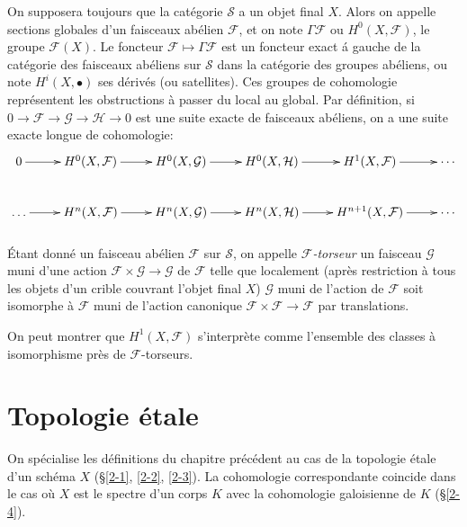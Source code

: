 \documentclass{article}
\newcommand{\cF}{\mathcal{F}}
\newcommand{\cG}{\mathcal{G}}
\newcommand{\cH}{\mathcal{H}}
\newcommand{\cS}{\mathcal{S}}
\begin{document}
On supposera toujours que la catégorie $\cS$ a un objet final $X$. Alors on 
appelle sections globales d'un faisceaux abélien $\cF$, et on note 
$\Gamma\cF$ ou $H^0(X,\cF)$, le groupe $\cF(X)$. Le foncteur 
$\cF\mapsto\Gamma\cF$ est un foncteur exact \'a gauche de la catégorie des 
faisceaux abéliens sur $\cS$ dans la catégorie des groupes abéliens, ou 
note $H^i(X,\bullet)$ ses dérivés (ou satellites). Ces groupes de 
cohomologie représentent les obstructions à passer du local au global. Par 
définition, si $0\to\cF\to\cG\to\cH\to 0$ est une suite exacte de faisceaux 
abéliens, on a une suite exacte longue de cohomologie:
\[\xymatrix{
  0 \ar[r] 
    & H^0(X,\cF) \ar[r] 
    & H^0(X,\cG) \ar[r] 
    & H^0(X,\cH) \ar[r] 
    & H^1(X,\cF) \ar[r] 
    & \cdots \\
  \ldots \ar[r] 
    & H^n(X,\cF) \ar[r] 
    & H^n(X,\cG) \ar[r]
    & H^n(X,\cH) \ar[r] 
    & H^{n+1}(X,\cF) \ar[r] 
    & \cdots
}\]





\subsubsection{}\label{1-6-6}

Étant donné un faisceau abélien $\cF$ sur $\cS$, on appelle 
\emph{$\cF$-torseur} un faisceau $\cG$ muni d'une action $\cF\times\cG\to\cG$ 
de $\cF$ telle que localement (après restriction à tous les objets d'un 
crible couvrant l'objet final $X$) $\cG$ muni de l'action de $\cF$ soit 
isomorphe à $\cF$ muni de l'action canonique $\cF\times \cF\to \cF$ par 
translations. 

On peut montrer que $H^1(X,\cF)$ s'interprète comme l'ensemble des classes 
à isomorphisme près de $\cF$-torseurs. 




















\section{Topologie étale}\label{2}

On spécialise les définitions du chapitre précédent au cas de la 
topologie étale d'un schéma $X$ (\S \ref{2-1}, \ref{2-2}, \ref{2-3}). La 
cohomologie correspondante coincide dans le cas où $X$ est le spectre d'un 
corps $K$ avec la cohomologie galoisienne de $K$ (\S\ref{2-4}). 
\end{document}
